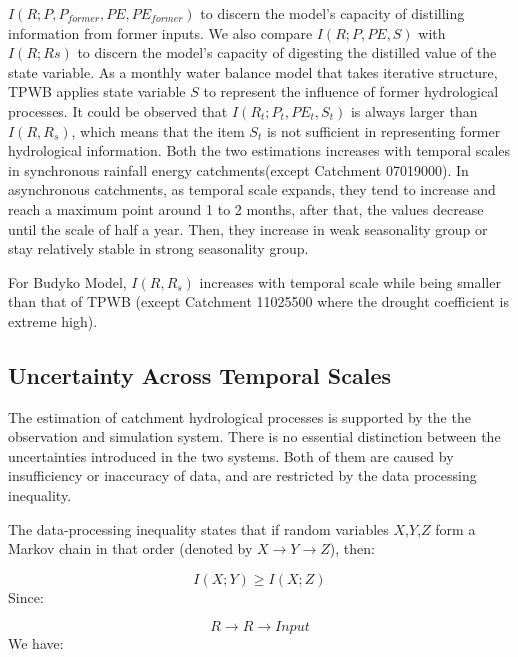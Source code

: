 \documentclass[review]{elsarticle}
\begin{document}
$I(R;P,P_{former},PE,PE_{former})$ to discern the model's capacity of distilling information from former inputs. We also compare $I(R;P,PE,S)$ with $I(R;Rs)$ to discern the model's capacity of digesting the distilled value of the state variable.
 As a monthly water balance model that takes  iterative structure, TPWB applies state variable $S$ to represent the influence of former hydrological processes. It could be observed that $I(R_t;P_t,PE_t,S_t)$ is always larger than $I(R,R_s)$, which means that the item $S_t$ is not sufficient in representing former hydrological information. Both the two estimations increases with temporal scales in synchronous rainfall energy catchments(except Catchment 07019000). In asynchronous catchments, as temporal scale expands, they tend to increase and reach a maximum point  around 1 to 2 months, after that, the values decrease until the scale of half a year. Then, they increase in weak seasonality group or stay relatively stable in strong seasonality group.
\fi

For Budyko Model, $I(R,R_s)$ increases  with temporal scale while being smaller than that of TPWB (except Catchment 11025500 where the drought coefficient is extreme high). 


\subsection{Uncertainty Across Temporal Scales}
The estimation of catchment hydrological processes is supported by the   the observation and simulation system. There is no essential distinction between the uncertainties introduced in the two systems. Both of them are caused by insufficiency or inaccuracy of data, and are restricted by the data processing inequality\citep{cover2012elements}.

The data-processing inequality states that if random variables $X$,$Y$,$Z$ form a Markov chain in that order (denoted by $X \rightarrow Y \rightarrow Z$), then:

\begin{equation}
I(X;Y) \geq I(X;Z)
\end{equation}
\iffalse
Since:

\begin{equation}
R \rightarrow R \rightarrow Input
\end{equation}
We have:
\end{document}

